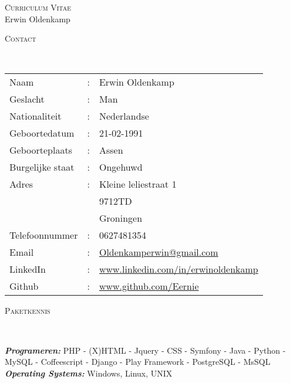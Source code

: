\documentclass[9pt]{article}
\newenvironment{changemargin}[2]{%
  \begin{list}{}{%
    \setlength{\topsep}{0pt}%
    \setlength{\leftmargin}{#1}%
    \setlength{\rightmargin}{#2}%
    \setlength{\listparindent}{\parindent}%
    \setlength{\itemindent}{\parindent}%
    \setlength{\parsep}{\parskip}%
  }%
  \item[]}{\end{list}
}
\newcommand{\lineover}{
	\begin{changemargin}{-0.05in}{-0.05in}
		\vspace*{-8pt}
		\hrulefill \\
		\vspace*{-2pt}
	\end{changemargin}
}
\newcommand{\header}[1]{
	\begin{changemargin}{-0.5in}{-0.5in}
		\scshape{#1}\\
  	\lineover
	\end{changemargin}
}
\newcommand{\PageHead}[2]{
	\begin{changemargin}{-0.5in}{-0.5in}
		\begin{center}
			{\Large \scshape {#1}}\\ \smallskip
			{\Large {#2}}
		\end{center}
	\end{changemargin}
}
\newenvironment{body} {
	\vspace*{-16pt}
	\begin{changemargin}{-0.25in}{-0.5in}
  }	
	{\end{changemargin}
}
\begin{document}
\PageHead{Curriculum Vitae}{Erwin Oldenkamp}


\header{Contact}

\begin{body}
	\vspace{14pt}
	\begin{tabular}{l l l}
		Naam&:&Erwin Oldenkamp \\
		Geslacht&:&Man  \\
		Nationaliteit&:&Nederlandse \\
		Geboortedatum&:&21-02-1991 \\
		Geboorteplaats&:&Assen \\
		Burgelijke staat&:&Ongehuwd \\
		Adres&:&Kleine leliestraat 1 \\ 
		& & 9712TD \\ 
   		& & Groningen \\ 
		Telefoonnummer & : & 0627481354 \\
		Email &:&  \href{mailto:oldenkamperwin@gmail.com}{Oldenkamperwin@gmail.com}\\
		LinkedIn & : & \href{http://www.linkedin.com/in/erwinoldenkamp}{www.linkedin.com/in/erwinoldenkamp} \\
		Github & : & \href{http://www.github.com/Eernie}{www.github.com/Eernie} \\
	\end{tabular}
\end{body}

\smallskip

\header{Paketkennis}

\begin{body}
	\vspace{14pt}
	\emph{\textbf{Programeren:}}{} PHP - (X)HTML - Jquery - CSS - Symfony - Java - Python - MySQL - Coffeescript - Django - Play Framework - PostgreSQL - MsSQL \\
	\medskip
	\emph{\textbf{Operating Systems:}}{} Windows, Linux, UNIX\\
\end{body}
\end{document}
